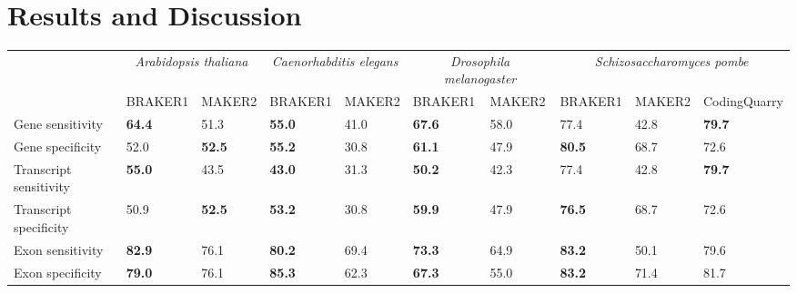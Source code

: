 \documentclass{bioinfo}
\begin{document}
\section{Results and Discussion}

\begin{table*}[!t]
{\begin{tabular}{lp{.9cm}p{.9cm}p{.9cm}p{.9cm}p{.9cm}p{.9cm}p{.9cm}p{.9cm}p{.9cm}}\hline
 & \multicolumn{2}{c}{\textit{Arabidopsis thaliana}} &  \multicolumn{2}{c}{\textit{Caenorhabditis elegans}} &  \multicolumn{2}{c}{\textit{Drosophila melanogaster}} &  \multicolumn{3}{c}{\textit{Schizosaccharomyces pombe}}\\
 & \tiny{BRAKER1} & \tiny{MAKER2} &  \tiny{BRAKER1} & \tiny{MAKER2}  & \tiny{BRAKER1} & \tiny{MAKER2} &\tiny{BRAKER1} & \tiny{MAKER2} &\tiny{CodingQuarry}\\
 \hline
Gene sensitivity        & \textbf{64.4} & 51.3          & \textbf{55.0} & 41.0 & \textbf{67.6} & 58.0 & 77.4 & 42.8 & \textbf{79.7}\\
Gene specificity        & 52.0          & \textbf{52.5} & \textbf{55.2} & 30.8 & \textbf{61.1} & 47.9 & \textbf{80.5} & 68.7 & 72.6\\
Transcript sensitivity  & \textbf{55.0} & 43.5          & \textbf{43.0} & 31.3 & \textbf{50.2} & 42.3 & 77.4 & 42.8 & \textbf{79.7}\\
Transcript specificity  & 50.9          & \textbf{52.5} & \textbf{53.2} & 30.8 & \textbf{59.9} & 47.9 & \textbf{76.5} & 68.7 & 72.6\\
Exon sensitivity        & \textbf{82.9} & 76.1          & \textbf{80.2} & 69.4 & \textbf{73.3} & 64.9 & \textbf{83.2} & 50.1 & 79.6\\
Exon specificity        & \textbf{79.0} & 76.1          & \textbf{85.3} & 62.3 & \textbf{67.3} & 55.0 & \textbf{83.2} & 71.4 & 81.7\\
\hline
\end{tabular}}{}
\end{table*}
\end{document}

